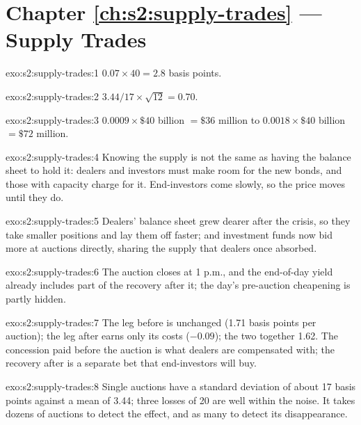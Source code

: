 \section*{Chapter \ref{ch:s2:supply-trades} --- Supply Trades}

\begin{solution}{exo:s2:supply-trades:1}
$0.07 \times 40 = 2.8$ basis points.
\end{solution}

\begin{solution}{exo:s2:supply-trades:2}
$3.44/17 \times \sqrt{12} = 0.70$.
\end{solution}

\begin{solution}{exo:s2:supply-trades:3}
$0.0009 \times \$40$ billion $= \$36$ million to $0.0018 \times \$40$ billion $= \$72$ million.
\end{solution}

\begin{solution}{exo:s2:supply-trades:4}
Knowing the supply is not the same as having the balance sheet to hold it: dealers and investors must make room for the new bonds, and those with
capacity charge for it. End-investors come slowly, so the price moves until they do.
\end{solution}

\begin{solution}{exo:s2:supply-trades:5}
Dealers' balance sheet grew dearer after the crisis, so they take smaller positions and lay them off faster; and investment funds now bid more at
auctions directly, sharing the supply that dealers once absorbed.
\end{solution}

\begin{solution}{exo:s2:supply-trades:6}
The auction closes at 1 p.m., and the end-of-day yield already includes part of the recovery after it; the day's pre-auction cheapening is
partly hidden.
\end{solution}

\begin{solution}{exo:s2:supply-trades:7}
The leg before is unchanged (1.71 basis points per auction); the leg after earns only its costs ($-0.09$); the two together 1.62. The concession paid
before the auction is what dealers are compensated with; the recovery after is a separate bet that end-investors will buy.
\end{solution}

\begin{solution}{exo:s2:supply-trades:8}
Single auctions have a standard deviation of about 17 basis points against a mean of 3.44; three losses of 20 are well within the noise. It takes
dozens of auctions to detect the effect, and as many to detect its disappearance.
\end{solution}

